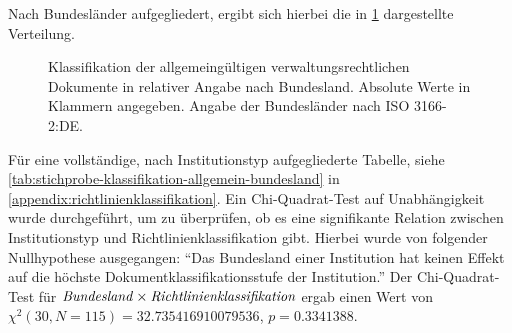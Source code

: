 Nach Bundesländer aufgegliedert, ergibt sich hierbei die in \cref{fig:policy-klassifikation-allgemein-absolut} dargestellte Verteilung.
\begin{figure}[!htbp]
    \centering
    \resizebox{\textwidth}{!}{}
    \caption{Klassifikation der allgemeingültigen verwaltungsrechtlichen Dokumente in relativer Angabe nach Bundesland. Absolute Werte in Klammern angegeben. Angabe der Bundesländer nach ISO 3166-2:DE.~\autocite{ISO3166}}
    \label{fig:policy-klassifikation-allgemein-absolut}
\end{figure}
Für eine vollständige, nach Institutionstyp aufgegliederte Tabelle, siehe \cref{tab:stichprobe-klassifikation-allgemein-bundesland} in \cref{appendix:richtlinienklassifikation}.
Ein Chi-Quadrat-Test auf Unabhängigkeit wurde durchgeführt, um zu überprüfen, ob es eine signifikante Relation zwischen Institutionstyp und Richtlinienklassifikation gibt.
Hierbei wurde von folgender Nullhypothese ausgegangen:
\enquote{Das Bundesland einer Institution hat keinen Effekt auf die höchste Dokumentklassifikationsstufe der Institution.}
Der Chi-Quadrat-Test für $\text{\textit{Bundesland}}\times\text{\textit{Richtlinienklassifikation}}$ ergab einen Wert von $\chi^2 (\num{30}, N = \num{115}) = \num[round-mode=places,round-precision=3]{32,735416910079536}$, $p = \num{0,3341388}$.

